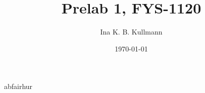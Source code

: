 \documentclass[a4paper,12pt]{article}
\title{Prelab 1, FYS-1120}
\author{Ina K. B. Kullmann}
\date{\today}
\begin{document}
\maketitle

\section{ }
\subsection{ }




abfairhur


\end{document}
